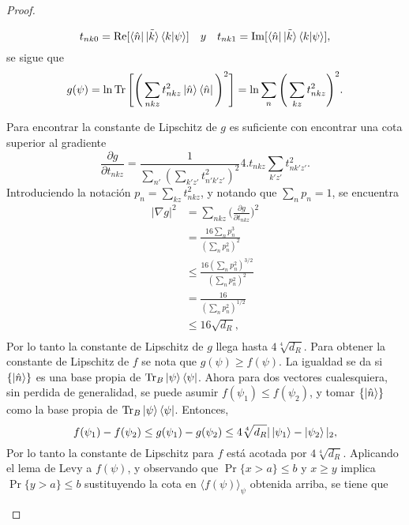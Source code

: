 \begin{proof}
\begin{enumerate}
\begin{equation}
t_{nk0}= \Re [ \bra{\hat{n}} \tilde{\ket{k}} \bra{k}\ket{\psi}] \quad y \quad  t_{nk1}= \Im [ \bra{\hat{n}} \tilde{\ket{k}} \bra{k}\ket{\psi}],
\end{equation}
se sigue que 
\begin{equation}
g(\psi)= \ln \Tr \Bigg[  \Bigg( \sum_{nkz} t_{nkz}^{2}  \ket{\hat{n}} \bra{\hat{n}}  \Bigg)^{2} \Bigg]= \ln \sum_{n} \Bigg( \sum_{kz} t_{nkz}^{2} \Bigg)^{2}.
\end{equation}

Para encontrar la constante de Lipschitz de $g$ es suficiente con encontrar una cota superior al gradiente 
\begin{equation}
\frac{\partial g}{\partial t_{nkz}}=\frac{1}{\sum_{n'} (\sum_{k'z'}t_{n'k'z'}^{2})^{2}} 4.t_{nkz} \sum_{k'z'}t_{nk'z'}^{2}.
\end{equation}
Introduciendo la notación $p_{n}=\sum_{kz}t_{nkz}^{2}$, y notando que $\sum_{n} p_{n}=1$, se encuentra 
\begin{align*}
|\nabla g|^{2} &= \sum_{nkz} \bigg(\frac{\partial g}{\partial t_{nkz}} \bigg )^{2} \\
&= \frac{16 \sum_{n} p_{n}^{3}}{(\sum_{n} p_{n}^{2})^{2}}\\
&\leq \frac{16(\sum_{n} p_{n}^{2})^{3/2}}{(\sum_{n} p_{n}^{2})^{2}}\\
&=\frac{16}{(\sum_{n} p_{n}^{2})^{1/2}}\\
&\leq 16 \sqrt{d_{R}},\\
\end{align*}
Por lo tanto la constante de Lipschitz de $g$ llega hasta $4 \sqrt[4]{d_{R}}$. Para obtener la constante de Lipschitz de $f$ se nota que $g(\psi) \geq f(\psi)$. La igualdad se da si $ \{ \ket{ \hat{n}} \} $ es una base  propia de $\Tr_{B} \ket{\psi}\bra{\psi}$. Ahora para dos vectores cualesquiera, sin perdida de generalidad, se puede asumir $f(\psi_{1}) \leq f(\psi_{2})$, y tomar $ \{ \ket{\hat{n}} \}$ como la base propia de $\Tr_{B} \ket{\psi}\bra{\psi}$. Entonces,
\begin{equation}
f(\psi_{1})- f(\psi_{2})\leq g(\psi_{1})- g(\psi_{2}) \leq 4\sqrt[4]{d_{R}} |\ket{\psi_{1}}-\ket{\psi_{2}}|_{2},
\end{equation}
Por lo tanto la constante de Lipschitz para $f$ está acotada por $4\sqrt[4]{d_{R}}$.
Aplicando el lema de Levy a $f(\psi)$, y observando que $\Pr \{ x>a \} \leq b$ y $x \geq y$ implica $\Pr \{ y>a \} \leq b$  sustituyendo la cota en $\langle f(\psi) \rangle_{\psi}$ obtenida arriba, se tiene que


\end{enumerate}
\end{proof}
